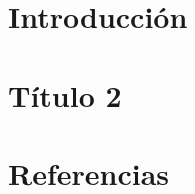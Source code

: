 \documentclass[titlepage,openany,twoside,a4paper,12pt,spanish]{book}
\begin{document}




\tableofcontents
\chapter{Introducción} %


\chapter{Título 2}


\chapter*{Referencias}

\end{document}
